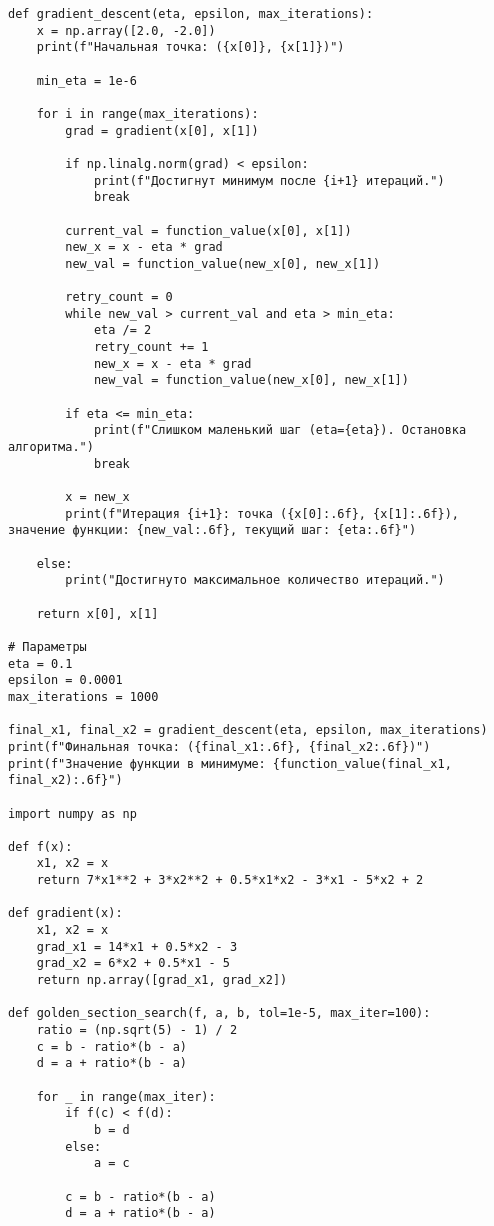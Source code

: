 \documentclass{article}
\begin{document}
\begin{lstlisting}
def gradient_descent(eta, epsilon, max_iterations):
    x = np.array([2.0, -2.0])
    print(f"Начальная точка: ({x[0]}, {x[1]})")

    min_eta = 1e-6  

    for i in range(max_iterations):
        grad = gradient(x[0], x[1])

        if np.linalg.norm(grad) < epsilon:
            print(f"Достигнут минимум после {i+1} итераций.")
            break

        current_val = function_value(x[0], x[1])
        new_x = x - eta * grad
        new_val = function_value(new_x[0], new_x[1])

        retry_count = 0
        while new_val > current_val and eta > min_eta:
            eta /= 2
            retry_count += 1
            new_x = x - eta * grad
            new_val = function_value(new_x[0], new_x[1])

        if eta <= min_eta:
            print(f"Слишком маленький шаг (eta={eta}). Остановка алгоритма.")
            break

        x = new_x
        print(f"Итерация {i+1}: точка ({x[0]:.6f}, {x[1]:.6f}), значение функции: {new_val:.6f}, текущий шаг: {eta:.6f}")

    else:
        print("Достигнуто максимальное количество итераций.")

    return x[0], x[1]

# Параметры
eta = 0.1
epsilon = 0.0001
max_iterations = 1000

final_x1, final_x2 = gradient_descent(eta, epsilon, max_iterations)
print(f"Финальная точка: ({final_x1:.6f}, {final_x2:.6f})")
print(f"Значение функции в минимуме: {function_value(final_x1, final_x2):.6f}")

import numpy as np

def f(x):
    x1, x2 = x
    return 7*x1**2 + 3*x2**2 + 0.5*x1*x2 - 3*x1 - 5*x2 + 2

def gradient(x):
    x1, x2 = x
    grad_x1 = 14*x1 + 0.5*x2 - 3
    grad_x2 = 6*x2 + 0.5*x1 - 5
    return np.array([grad_x1, grad_x2])

def golden_section_search(f, a, b, tol=1e-5, max_iter=100):
    ratio = (np.sqrt(5) - 1) / 2
    c = b - ratio*(b - a)
    d = a + ratio*(b - a)

    for _ in range(max_iter):
        if f(c) < f(d):
            b = d
        else:
            a = c

        c = b - ratio*(b - a)
        d = a + ratio*(b - a)


\end{lstlisting}
\end{document}
